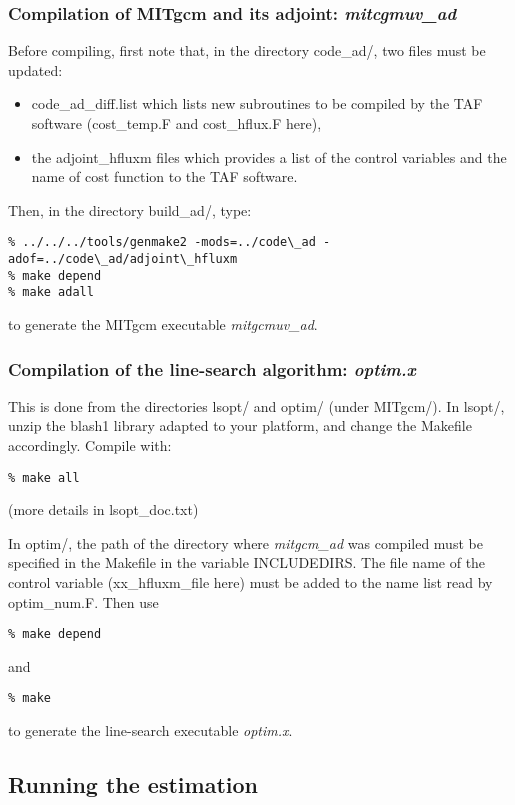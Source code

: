 \subsubsection{Compilation of MITgcm and its adjoint: {\it mitcgmuv\_ad}}

Before compiling, first note that, in the directory code\_ad/, two files
must be updated:
\begin{itemize}
\item code\_ad\_diff.list which lists new subroutines to be compiled
by the TAF software (cost\_temp.F and cost\_hflux.F here),

\item  the adjoint\_hfluxm files which provides a list of the control variables
and the name of cost function to the TAF software.

\end{itemize}

Then, in the directory build\_ad/, type:
\begin{verbatim}
% ../../../tools/genmake2 -mods=../code\_ad -adof=../code\_ad/adjoint\_hfluxm
% make depend
% make adall
\end{verbatim}
to generate the MITgcm executable {\it mitgcmuv\_ad}.

\subsubsection{Compilation of the line-search algorithm: {\it optim.x}}

This is done from the directories lsopt/ and optim/ (under MITgcm/). In lsopt/,
unzip the blash1 library adapted to your platform, and change the Makefile
accordingly. Compile with:
\begin{verbatim}
% make all
\end{verbatim}
(more details in lsopt\_doc.txt)

In optim/,  the path of the directory where {\it mitgcm\_ad} was compiled
must be specified in the Makefile in the variable INCLUDEDIRS. The file name
of the control variable (xx\_hfluxm\_file here) must be added to the name list
read by optim\_num.F. Then use
\begin{verbatim}
% make depend
\end{verbatim} 
and
\begin{verbatim}
% make
\end{verbatim}
to generate the line-search executable {\it optim.x}.

\subsection{Running the estimation}

